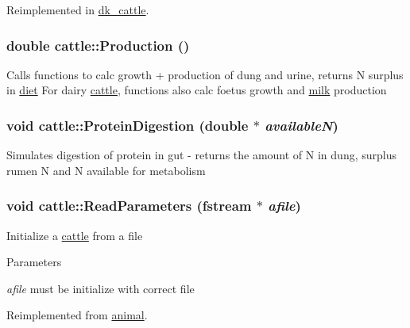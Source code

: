 Reimplemented in \hyperlink{classdk__cattle_a2d6a1d109141cc874f41d4e462eaa728}{dk\_\-cattle}.\hypertarget{classcattle_a6baa384415f687dbe7fa420cb46bb62e}{
\subsubsection[{Production}]{\setlength{\rightskip}{0pt plus 5cm}double cattle::Production ()}}
\label{classcattle_a6baa384415f687dbe7fa420cb46bb62e}
Calls functions to calc growth + production of dung and urine, returns N surplus in \hyperlink{classdiet}{diet} For dairy \hyperlink{classcattle}{cattle}, functions also calc foetus growth and \hyperlink{classmilk}{milk} production \hypertarget{classcattle_a88117c15ba8d100cc4489d7f8f125b76}{
\subsubsection[{ProteinDigestion}]{\setlength{\rightskip}{0pt plus 5cm}void cattle::ProteinDigestion (double $\ast$ {\em availableN})}}
\label{classcattle_a88117c15ba8d100cc4489d7f8f125b76}
Simulates digestion of protein in gut -\/ returns the amount of N in dung, surplus rumen N and N available for metabolism \hypertarget{classcattle_a13ca8c9803fc7d414933e0cacb5e398c}{
\subsubsection[{ReadParameters}]{\setlength{\rightskip}{0pt plus 5cm}void cattle::ReadParameters (fstream $\ast$ {\em afile})}}
\label{classcattle_a13ca8c9803fc7d414933e0cacb5e398c}
Initialize a \hyperlink{classcattle}{cattle} from a file 
\begin{DoxyParams}{Parameters}
\item[{\em afile}]must be initialize with correct file \end{DoxyParams}


Reimplemented from \hyperlink{classanimal_ad7a71ab5ae87becfa921f70501cf4ee1}{animal}.

